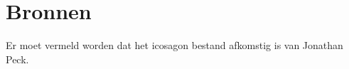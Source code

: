 \section{Bronnen}
Er moet vermeld worden dat het icosagon bestand afkomstig is van Jonathan Peck. 

